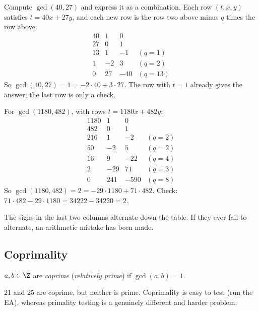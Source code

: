 \begin{example}
Compute $\gcd(40,27)$ and express it as a combination. Each row $(t,x,y)$ satisfies $t=40x+27y$, and each new row is the row two above minus $q$ times the row above:
\[
\begin{array}{rrrl}
40 & 1 & 0 & \\
27 & 0 & 1 & \\
13 & 1 & -1 & (q=1)\\
1 & -2 & 3 & (q=2)\\
0 & 27 & -40 & (q=13)
\end{array}
\]
So $\gcd(40,27)=1=-2\cdot40+3\cdot27$. The row with $t=1$ already gives the answer; the last row is only a check.
\end{example}

\begin{example}
For $\gcd(1180,482)$, with rows $t=1180x+482y$:
\[
\begin{array}{rrrl}
1180 & 1 & 0 & \\
482 & 0 & 1 & \\
216 & 1 & -2 & (q=2)\\
50 & -2 & 5 & (q=2)\\
16 & 9 & -22 & (q=4)\\
2 & -29 & 71 & (q=3)\\
0 & 241 & -590 & (q=8)
\end{array}
\]
So $\gcd(1180,482)=2=-29\cdot1180+71\cdot482$. Check: $71\cdot482-29\cdot1180=34222-34220=2$.
\end{example}

\begin{note}
The signs in the last two columns alternate down the table. If they ever fail to alternate, an arithmetic mistake has been made.
\end{note}

\subsection{Coprimality}
\label{sec:7-9}

\begin{definition}[Coprime]
$a,b\in\Z$ are \emph{coprime} (\emph{relatively prime}) if $\gcd(a,b)=1$.
\end{definition}

\begin{note}
$21$ and $25$ are coprime, but neither is prime. Coprimality is easy to test (run the EA), whereas primality testing is a genuinely different and harder problem.
\end{note}

